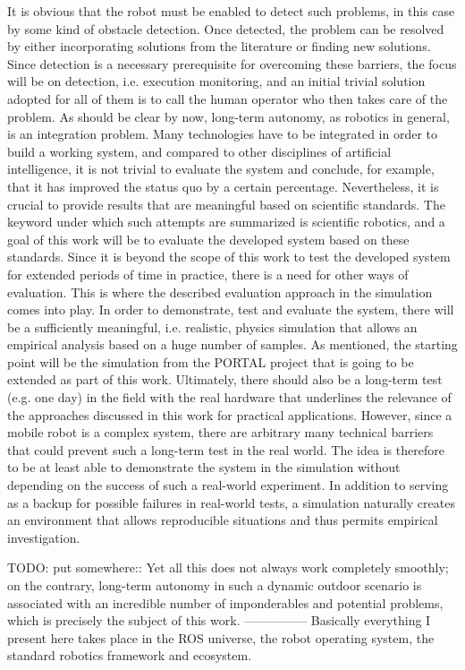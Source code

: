 \documentclass[english, master, utf8]{base/thesis_KBS}
\begin{document}
It is obvious that the robot must be enabled to detect such problems, in this case by some kind of obstacle detection.
Once detected, the problem can be resolved by either incorporating solutions from the literature or finding new solutions.
Since detection is a necessary prerequisite for overcoming these barriers, the focus will be on detection, i.e. execution monitoring,
and an initial trivial solution adopted for all of them is to call the human operator who then takes care of the problem.\newline
As should be clear by now, long-term autonomy, as robotics in general, is an integration problem. Many technologies have to be integrated in order to build a working system, 
and compared to other disciplines of artificial intelligence, it is not trivial to evaluate the system and conclude, for example, that it has improved the status quo by a 
certain percentage. Nevertheless, it is crucial to provide results that are meaningful based on scientific standards. 
The keyword under which such attempts are summarized is scientific robotics, and a goal of this work will be to evaluate the developed system based on these standards.
Since it is beyond the scope of this work to test the developed system for extended periods of time in practice, there is a need for other ways of evaluation.
This is where the described evaluation approach in the simulation comes into play. In order to demonstrate, test and evaluate the system, there will be a sufficiently meaningful, 
i.e. realistic, physics simulation that allows an empirical analysis based on a huge number of samples. As mentioned, the starting point will be the simulation from the 
PORTAL project that is going to be extended as part of this work. Ultimately, there should also be a long-term test (e.g. one day) in the field with the real hardware that 
underlines the relevance of the approaches discussed in this work for practical applications. However, since a mobile robot is a complex system, there are arbitrary 
many technical barriers that could prevent such a long-term test in the real world. The idea is therefore to be at least able to demonstrate the system in the simulation
without depending on the success of such a real-world experiment. In addition to serving as a backup for possible failures in real-world tests,
a simulation naturally creates an environment that allows reproducible situations and thus permits empirical investigation.\newline

TODO: put somewhere::
Yet all this does not always work completely smoothly; on the contrary, long-term autonomy in such a dynamic outdoor scenario is associated with an incredible number of
imponderables and potential problems, which is precisely the subject of this work.\newline
---------------\newline
Basically everything I present here takes place in the ROS universe, the robot operating system, the standard robotics framework and ecosystem.\newline
\end{document}
